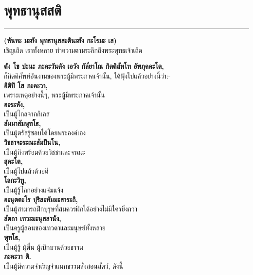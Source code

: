 \documentclass[12pt]{article}
\begin{document}
\section{พุทธานุสสติ}
\hrule
\begin{center}
\textbf{(หันทะ มะยัง พุทธานุสสะตินะยัง กะโรมะ เส)}\\
เชิญเถิด เราทั้งหลาย ทำความตามระลึกถึงพระพุทธเจ้าเถิด
\end{center}
\textbf{ตัง โข ปะนะ ภะคะวันตัง เอวัง กัล๎ยาโณ กิตติสัทโท อัพภุคคะโต,}\\
\indent ก็กิตติศัพท์อันงามของพระผู้มีพระภาคเจ้านั้น, ได้ฟุ้งไปแล้วอย่างนี้ว่า:-\\
\textbf{อิติปิ โส ภะคะวา,}\\
\indent เพราะเหตุอย่างนี้ๆ, พระผู้มีพระภาคเจ้านั้น\\
\textbf{อะระหัง,}\\
\indent เป็นผู้ไกลจากกิเลส\\
\textbf{สัมมาสัมพุทโธ,}\\
\indent เป็นผู้ตรัสรู้ชอบได้โดยพระองค์เอง\\
\textbf{วิชชาจะระณะสัมปันโน,}\\
\indent เป็นผู้ถึงพร้อมด้วยวิชชาและจรณะ\\
\textbf{สุคะโต,}\\
\indent เป็นผู้ไปแล้วด้วยดี\\
\textbf{โลกะวิทู,}\\
\indent เป็นผู้รู้โลกอย่างแจ่มแจ้ง\\
\textbf{อะนุตตะโร ปุริสะทัมมะสาระถิ,}\\
\indent เป็นผู้สามารถฝึกบุรุษที่สมควรฝึกได้อย่างไม่มีใครยิ่งกว่า\\
\textbf{สัตถา เทวะมะนุสสานัง,}\\
\indent เป็นครูผู้สอนของเทวดาและมนุษย์ทั้งหลาย\\
\textbf{พุทโธ,}\\
\indent เป็นผู้รู้ ผู้ตื่น ผู้เบิกบานด้วยธรรม\\
\textbf{ภะคะวา ติ.}\\
\indent เป็นผู้มีความจำเริญจำแนกธรรมสั่งสอนสัตว์, ดังนี้\\

\pagebreak
\end{document}
